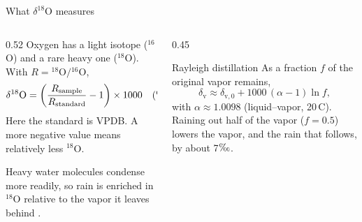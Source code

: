 \documentclass[aspectratio=169,11pt]{beamer}
\newcommand{\permil}{\ensuremath{\text{\textperthousand}}}
\newcommand{\dO}{$\delta^{18}$O}
\begin{document}
\begin{frame}{What \dO{} measures}
  \begin{columns}[T]
    \begin{column}{0.52\textwidth}\small
      Oxygen has a light isotope ($^{16}$O) and a rare heavy one ($^{18}$O).
      With $R = {}^{18}\mathrm{O}/{}^{16}\mathrm{O}$,
      \[
        \delta^{18}\mathrm{O} =
        \left(\frac{R_\mathrm{sample}}{R_\mathrm{standard}} - 1\right)
        \times 1000 \quad (\text{\permil}).
      \]
      Here the standard is VPDB. A more negative value means relatively
      less $^{18}$O.
      \par\medskip
      Heavy water molecules condense more readily, so rain is enriched in
      $^{18}$O relative to the vapor it leaves behind
      \citep{Dansgaard1964}.
    \end{column}
    \begin{column}{0.45\textwidth}
      \begin{block}{Rayleigh distillation}
        \small As a fraction $f$ of the original vapor remains,
        \[
          \delta_\mathrm{v} \approx \delta_{\mathrm{v},0}
          + 1000\,(\alpha - 1)\ln f ,
        \]
        with $\alpha \approx 1.0098$ (liquid--vapor, 20\,\textdegree C).
        Raining out half of the vapor ($f=0.5$) lowers the vapor, and the
        rain that follows, by about 7\permil.
      \end{block}
    \end{column}
  \end{columns}
\end{frame}
\end{document}
